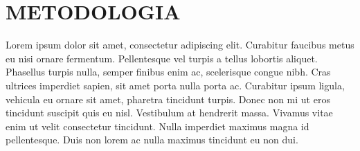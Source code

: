 \chapter{METODOLOGIA}

Lorem ipsum dolor sit amet, consectetur adipiscing elit. Curabitur faucibus metus eu nisi ornare fermentum. Pellentesque vel turpis a tellus lobortis aliquet. Phasellus turpis nulla, semper finibus enim ac, scelerisque congue nibh. Cras ultrices imperdiet sapien, sit amet porta nulla porta ac. Curabitur ipsum ligula, vehicula eu ornare sit amet, pharetra tincidunt turpis. Donec non mi ut eros tincidunt suscipit quis eu nisl. Vestibulum at hendrerit massa. Vivamus vitae enim ut velit consectetur tincidunt. Nulla imperdiet maximus magna id pellentesque. Duis non lorem ac nulla maximus tincidunt eu non dui.

